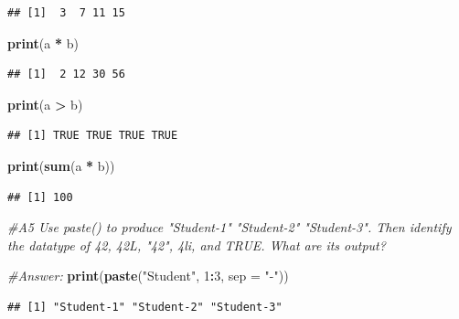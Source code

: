 \documentclass[
]{article}
\newenvironment{Shaded}{\begin{snugshade}}{\end{snugshade}}
\newcommand{\AttributeTok}[1]{\textcolor[rgb]{0.13,0.29,0.53}{#1}}
\newcommand{\CommentTok}[1]{\textcolor[rgb]{0.56,0.35,0.01}{\textit{#1}}}
\newcommand{\DecValTok}[1]{\textcolor[rgb]{0.00,0.00,0.81}{#1}}
\newcommand{\FunctionTok}[1]{\textcolor[rgb]{0.13,0.29,0.53}{\textbf{#1}}}
\newcommand{\NormalTok}[1]{#1}
\newcommand{\SpecialCharTok}[1]{\textcolor[rgb]{0.81,0.36,0.00}{\textbf{#1}}}
\newcommand{\StringTok}[1]{\textcolor[rgb]{0.31,0.60,0.02}{#1}}
\begin{document}
\begin{verbatim}
## [1]  3  7 11 15
\end{verbatim}

\begin{Shaded}
\begin{Highlighting}[]
\FunctionTok{print}\NormalTok{(a }\SpecialCharTok{*}\NormalTok{ b)}
\end{Highlighting}
\end{Shaded}

\begin{verbatim}
## [1]  2 12 30 56
\end{verbatim}

\begin{Shaded}
\begin{Highlighting}[]
\FunctionTok{print}\NormalTok{(a }\SpecialCharTok{\textgreater{}}\NormalTok{ b)}
\end{Highlighting}
\end{Shaded}

\begin{verbatim}
## [1] TRUE TRUE TRUE TRUE
\end{verbatim}

\begin{Shaded}
\begin{Highlighting}[]
\FunctionTok{print}\NormalTok{(}\FunctionTok{sum}\NormalTok{(a }\SpecialCharTok{*}\NormalTok{ b))}
\end{Highlighting}
\end{Shaded}

\begin{verbatim}
## [1] 100
\end{verbatim}

\begin{Shaded}
\begin{Highlighting}[]
\CommentTok{\#A5 Use paste() to produce "Student{-}1" "Student{-}2" "Student{-}3". Then identify the datatype of 42, 42L, "42", 4li, and TRUE. What are its output?}

\CommentTok{\#Answer: }
\FunctionTok{print}\NormalTok{(}\FunctionTok{paste}\NormalTok{(}\StringTok{"Student"}\NormalTok{, }\DecValTok{1}\SpecialCharTok{:}\DecValTok{3}\NormalTok{, }\AttributeTok{sep =} \StringTok{"{-}"}\NormalTok{))}
\end{Highlighting}
\end{Shaded}

\begin{verbatim}
## [1] "Student-1" "Student-2" "Student-3"
\end{verbatim}
\end{document}
